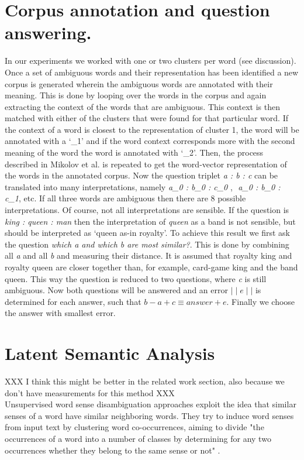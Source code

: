 \documentclass[11pt]{article}
\begin{document}
\section{Corpus annotation and question answering.}
In our experiments we worked with one or two clusters per word (see discussion).
Once a set of ambiguous words and their representation has been identified a new corpus is generated wherein the ambiguous words are annotated with their meaning. This is done by looping over the words in the corpus and again extracting the context of the words that are ambiguous. This context is then matched with either of the clusters that were found for that particular word. If the context of a word is closest to the representation of cluster 1, the word will be annotated with a `\_1' and if the word context corresponds more with the second meaning of the word the word is annotated with `\_2'. Then, the process described in Mikolov et al. is repeated to get the word-vector representation of the words in the annotated corpus. Now the question triplet \textit{a : b : c} can be translated into many interpretations, namely \textit{a\_0 : b\_0 : c\_0} $ $, $ $ \textit{a\_0 : b\_0 : c\_1}, etc. If all three words are ambiguous then there are 8 possible interpretations. Of course, not all interpretations are sensible. If the question is \textit{king : queen : man} then the interpretation of \textit{queen} as a band is not sensible, but should be interpreted as `queen as-in royalty'. To achieve this result we first ask the question \textit{which a and which b are most similar?}. This is done by combining all \textit{a} and all \textit{b} and measuring their distance. It is assumed that royalty king and royalty queen are closer together than, for example, card-game king and the band queen. This way the question is reduced to two questions, where \textit{c} is still ambiguous. Now both questions will be answered and an error $\mid\mid \textit{e} \mid\mid$ is determined for each answer, such that $\textit{b} - \textit{a} + \textit{c} \equiv \textit{answer} + \textit{e}$. Finally we choose the answer with smallest error.

\section{Latent Semantic Analysis}
XXX I think this might be better in the related work section, also because we don't have measurements for this method XXX\\
Unsupervised word sense disambiguation approaches exploit the idea that similar senses of a word have similar neighboring words. They try to induce word senses from input text by clustering word co-occurrences, aiming to divide "the occurrences of a word into a number of classes by determining for any two occurrences whether they belong to the same sense or not" \cite{Schutze:98}.
\end{document}
